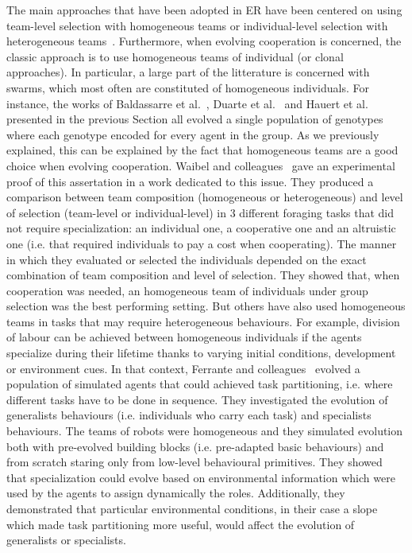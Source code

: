     The main approaches that have been adopted in ER have been centered on using team-level selection with homogeneous teams or individual-level selection with heterogeneous teams~\parencite{Waibel2009}. Furthermore, when evolving cooperation is concerned, the classic approach is to use homogeneous teams of individual (or clonal approaches). In particular, a large part of the litterature is concerned with swarms, which most often are constituted of homogeneous individuals. For instance, the works of Baldassarre et al.~\parencite{Baldassarre}, Duarte et al.~\parencite{Duarte2016} and Hauert et al.~\parencite{Hauert2009} presented in the previous Section all evolved a single population of genotypes where each genotype encoded for every agent in the group. As we previously explained, this can be explained by the fact that homogeneous teams are a good choice when evolving cooperation. Waibel and colleagues~\parencite{Waibel2009} gave an experimental proof of this assertation in a work dedicated to this issue. They produced a comparison between team composition (homogeneous or heterogeneous) and level of selection (team-level or individual-level) in $3$ different foraging tasks that did not require specialization: an individual one, a cooperative one and an altruistic one (i.e. that required individuals to pay a cost when cooperating). The manner in which they evaluated or selected the individuals depended on the exact combination of team composition and level of selection. They showed that, when cooperation was needed, an homogeneous team of individuals under group selection was the best performing setting. But others have also used homogeneous teams in tasks that may require heterogeneous behaviours. For example, division of labour can be achieved between homogeneous individuals if the agents specialize during their lifetime thanks to varying initial conditions, development or environment cues. In that context, Ferrante and colleagues~\parencite{Ferrante2015} evolved a population of simulated agents that could achieved task partitioning, i.e. where different tasks have to be done in sequence. They investigated the evolution of generalists behaviours (i.e. individuals who carry each task) and specialists behaviours. The teams of robots were homogeneous and they simulated evolution both with pre-evolved building blocks (i.e. pre-adapted basic behaviours) and from scratch staring only from low-level behavioural primitives. They showed that specialization could evolve based on environmental information which were used by the agents to assign dynamically the roles. Additionally, they demonstrated that particular environmental conditions, in their case a slope which made task partitioning more useful, would affect the evolution of generalists or specialists.

